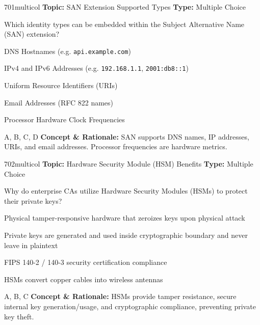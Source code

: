 \begin{qcard}{701}{multicol}
\textcolor{darkslate!75}{\small\textbf{Topic:} SAN Extension Supported Types \hfill \textbf{Type:} Multiple Choice}\vspace{0.4em}\par
Which identity types can be embedded within the Subject Alternative Name (SAN) extension?
\begin{qoptions}
\item DNS Hostnames (e.g. \texttt{api.example.com})
\item IPv4 and IPv6 Addresses (e.g. \texttt{192.168.1.1}, \texttt{2001:db8::1})
\item Uniform Resource Identifiers (URIs)
\item Email Addresses (RFC 822 names)
\item Processor Hardware Clock Frequencies
\end{qoptions}
\end{qcard}
\nopagebreak
\begin{explainbox}{A, B, C, D}
\textbf{Concept \& Rationale:} SAN supports DNS names, IP addresses, URIs, and email addresses. Processor frequencies are hardware metrics.
\end{explainbox}

\begin{qcard}{702}{multicol}
\textcolor{darkslate!75}{\small\textbf{Topic:} Hardware Security Module (HSM) Benefits \hfill \textbf{Type:} Multiple Choice}\vspace{0.4em}\par
Why do enterprise CAs utilize Hardware Security Modules (HSMs) to protect their private keys?
\begin{qoptions}
\item Physical tamper-responsive hardware that zeroizes keys upon physical attack
\item Private keys are generated and used inside cryptographic boundary and never leave in plaintext
\item FIPS 140-2 / 140-3 security certification compliance
\item HSMs convert copper cables into wireless antennas
\end{qoptions}
\end{qcard}
\nopagebreak
\begin{explainbox}{A, B, C}
\textbf{Concept \& Rationale:} HSMs provide tamper resistance, secure internal key generation/usage, and cryptographic compliance, preventing private key theft.
\end{explainbox}

